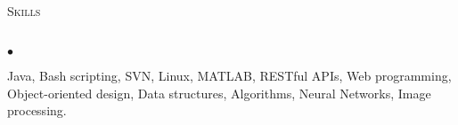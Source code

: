 \documentclass[11pt]{article}
\newcommand{\lineunder}{\vspace*{-8pt} \\ \hspace*{-18pt} \hrulefill \\}
\newcommand{\header}[1]{{\hspace*{-15pt}\vspace*{6pt} \textsc{#1}} \vspace*{-6pt} \lineunder}
\newcommand{\employer}[3]{{ \textbf{#1} \\ \underline{\textbf{\emph{#3}}} \hfill  #2\\  }}
\newenvironment{achievements}{\begin{list}{$\bullet$}{\topsep 0pt \itemsep -2pt}}{\vspace*{4pt}\end{list}}
\begin{document}




\header{Skills}
\begin{achievements}
\item Java, Bash scripting, SVN, Linux, MATLAB, RESTful APIs, Web programming, Object-oriented design, Data structures, Algorithms, Neural Networks, Image processing.
\end{achievements}
\end{document}
